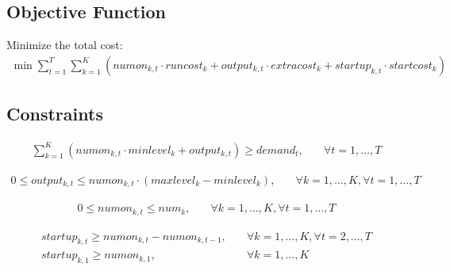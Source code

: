 \documentclass{article}
\begin{document}
\subsection*{Objective Function}
Minimize the total cost:
\begin{align*}
\min \sum_{t=1}^{T} \sum_{k=1}^{K} \left( numon_{k,t} \cdot runcost_k + output_{k,t} \cdot extracost_k + startup_{k,t} \cdot startcost_k \right)
\end{align*}

\subsection*{Constraints}
\begin{align*}
\sum_{k=1}^{K} \left( numon_{k,t} \cdot minlevel_k + output_{k,t} \right) \geq demand_t, & \quad \forall t = 1, \ldots, T
\end{align*}

\begin{align*}
0 \leq output_{k,t} \leq numon_{k,t} \cdot (maxlevel_k - minlevel_k), & \quad \forall k = 1, \ldots, K, \forall t = 1, \ldots, T
\end{align*}

\begin{align*}
0 \leq numon_{k,t} \leq num_k, & \quad \forall k = 1, \ldots, K, \forall t = 1, \ldots, T
\end{align*}

\begin{align*}
startup_{k,t} \geq numon_{k,t} - numon_{k,t-1}, & \quad \forall k = 1, \ldots, K, \forall t = 2, \ldots, T \\
startup_{k,1} \geq numon_{k,1}, & \quad \forall k = 1, \ldots, K
\end{align*}
\end{document}
